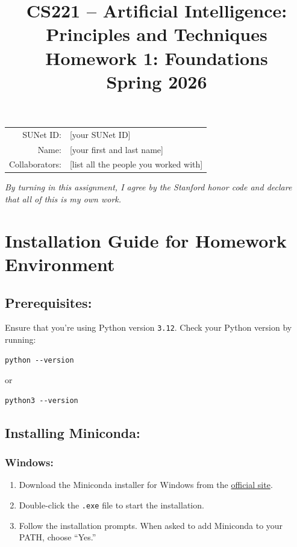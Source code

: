 \documentclass{article}
\title{\textbf{CS221 -- Artificial Intelligence: \\Principles and Techniques}\\Homework 1: Foundations\\Spring 2026}
\date{}
\theoremstyle{case}
\theoremstyle{definition}
\begin{document}
\maketitle

\begin{center}
\begin{tabular}{rl}
SUNet ID: & [your SUNet ID] \\
Name: & [your first and last name] \\
Collaborators: & [list all the people you worked with]
\end{tabular}
\end{center}

\textit{By turning in this assignment, I agree by the Stanford honor code and declare that all of this is my own work.} \\

\section*{Installation Guide for Homework Environment}

\subsection*{Prerequisites:}
Ensure that you're using Python version \texttt{3.12}. Check your Python version by running:

\begin{verbatim}
python --version
\end{verbatim}

or

\begin{verbatim}
python3 --version
\end{verbatim}

\subsection*{Installing Miniconda:}

\subsubsection*{Windows:}
\begin{enumerate}
    \item Download the Miniconda installer for Windows from the \href{https://docs.conda.io/en/latest/miniconda.html}{official site}.
    \item Double-click the \texttt{.exe} file to start the installation.
    \item Follow the installation prompts. When asked to add Miniconda to your PATH, choose ``Yes.''
\end{enumerate}
\end{document}
